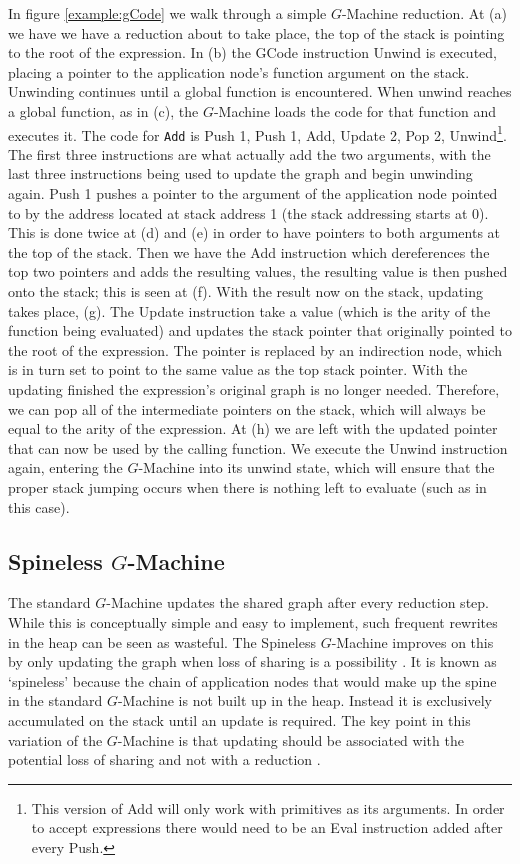 In figure \ref{example:gCode} we walk through a simple $G$-Machine reduction.
At (a) we have we have a reduction about to take place, the top of the stack is
pointing to the root of the expression. In (b) the GCode instruction Unwind is
executed, placing a pointer to the application node's function argument on the
stack. Unwinding continues until a global function is encountered.
When unwind reaches a global function, as in (c), the $G$-Machine loads
the code for that function and executes it. The code for \verb-Add- is Push 1,
Push 1, Add, Update 2, Pop 2, Unwind\footnote{This version of Add will only work
with primitives as its arguments. In order to accept expressions there would
need to be an Eval instruction added after every Push.}.
The first three instructions are what
actually add the two arguments, with the last three instructions being used to
update the graph and begin unwinding again. Push 1 pushes a pointer to the
argument of the application node pointed to by the address located at stack
address 1 (the stack addressing starts at 0). This is done twice at (d)
and (e) in order to have pointers to both arguments at the top of the stack.
Then we have the Add instruction which dereferences the top two pointers and
adds the resulting values, the resulting value is then pushed onto the stack;
this is seen at (f). With the result now on the stack, updating takes place, (g).
The Update instruction take a value (which is the arity of the function being
evaluated) and updates the stack pointer that originally pointed to the root of
the expression. The pointer is replaced by an indirection node, which is in turn
set to point to the same value as the top stack pointer. With the updating
finished the expression's original graph is no longer needed. Therefore, we can
pop all of the intermediate pointers on the stack, which will always be equal to
the arity of the expression. At (h) we are left with the updated pointer that
can now be used by the calling function. We execute the Unwind instruction again,
entering the $G$-Machine into its unwind state, which will ensure that the
proper stack jumping occurs when there is nothing left to evaluate (such as in
this case).

 \subsection{Spineless $G$-Machine}
    The standard $G$-Machine updates the shared graph after every reduction
step. While this is conceptually simple and easy to implement, such frequent
rewrites in the heap can be seen as wasteful. The Spineless
$G$-Machine improves on this by only updating the graph when loss of sharing is
a possibility \citep{burn1988spineless}. It is known as `spineless' because the
chain of application nodes that would make up the spine in the standard
$G$-Machine is not built up in the heap. Instead it is exclusively
accumulated on the stack until an update is required. The key point in this
variation of the $G$-Machine is that updating should be associated with the
potential loss of sharing and not with a reduction \citep{burn1988spineless}.

